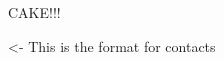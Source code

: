 \documentclass[char]{GL2020}
\begin{document}
\name{\cTest{}}
CAKE!!!

\begin{itemz}[Goals]
	\item 
\end{itemz}

\begin{itemz}[Notes]
	\item 
\end{itemz}

\begin{contacts}
	\contact{\cTest{}} <- This is the format for contacts 
\end{contacts}
\end{document}
